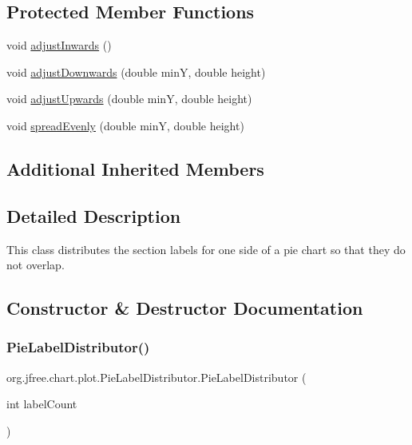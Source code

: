 \subsection*{Protected Member Functions}
\begin{DoxyCompactItemize}
\item 
void \mbox{\hyperlink{classorg_1_1jfree_1_1chart_1_1plot_1_1_pie_label_distributor_a476218b84d0bbdb44468177d56d81ad2}{adjust\+Inwards}} ()
\item 
void \mbox{\hyperlink{classorg_1_1jfree_1_1chart_1_1plot_1_1_pie_label_distributor_ad93c4a06aa785d388cedca6d4308256c}{adjust\+Downwards}} (double minY, double height)
\item 
void \mbox{\hyperlink{classorg_1_1jfree_1_1chart_1_1plot_1_1_pie_label_distributor_a6a3f796644616599a8794d73bd65cd0e}{adjust\+Upwards}} (double minY, double height)
\item 
void \mbox{\hyperlink{classorg_1_1jfree_1_1chart_1_1plot_1_1_pie_label_distributor_aaae8aef8f4804cbb4b944241ef8e1caa}{spread\+Evenly}} (double minY, double height)
\end{DoxyCompactItemize}
\subsection*{Additional Inherited Members}


\subsection{Detailed Description}
This class distributes the section labels for one side of a pie chart so that they do not overlap. 

\subsection{Constructor \& Destructor Documentation}
\mbox{\label{classorg_1_1jfree_1_1chart_1_1plot_1_1_pie_label_distributor_add33e8ee5fd3c290272b3e9eb1569c73}} 
\subsubsection{\texorpdfstring{Pie\+Label\+Distributor()}{PieLabelDistributor()}}
{\footnotesize\ttfamily org.\+jfree.\+chart.\+plot.\+Pie\+Label\+Distributor.\+Pie\+Label\+Distributor (\begin{DoxyParamCaption}\item[{int}]{label\+Count }\end{DoxyParamCaption})}

